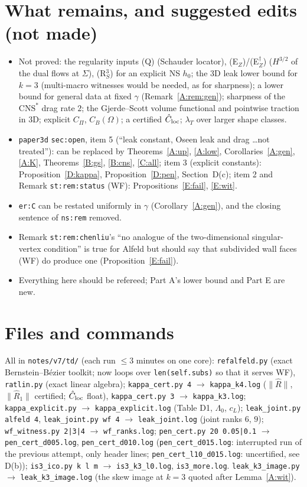 \documentclass[11pt,reqno]{amsart}
\theoremstyle{plain}
\theoremstyle{definition}
\newcommand{\norm}[1]{\lVert #1\rVert}
\newcommand{\CNS}{\mathrm{CNS}^\ast}
\begin{document}
\section{What remains, and suggested edits (not made)}\label{sec:open}
\begin{itemize}
\item Not proved: the regularity inputs (Q) (Schauder locator), (E$_Z$)/(E$_Z^\dagger$) ($H^{3/2}$ of the dual flows at $\Sigma$), (R$_S^3$) for an explicit NS $h_0$; the 3D leak lower bound for $k=3$ (multi-macro witnesses would be needed, as for sharpness); a lower bound for general data at fixed $\gamma$ (Remark~\ref{A:rem:gen}); sharpness of the $\CNS$ drag rate $2$; the Gjerde--Scott volume functional and pointwise traction in 3D; explicit $C_\Pi$, $C_B(\Omega)$; a certified $\hat C_{\rm loc}$; $\lambda_T$ over larger shape classes.
\item \texttt{paper3d} \texttt{sec:open}, item 5 (``leak constant, Oseen leak and drag \dots not treated''): can be replaced by Theorems~\ref{A:up}, \ref{A:low}, Corollaries~\ref{A:gen}, \ref{A:K}, Theorems~\ref{B:gs}, \ref{B:cns}, \ref{C:all}; item 3 (explicit constants): Proposition~\ref{D:kappa}, Proposition~\ref{D:pen}, Section~D(c); item 2 and Remark \texttt{st:rem:status} (WF): Propositions~\ref{E:fail}, \ref{E:wit}.
\item \texttt{er:C} can be restated uniformly in $\gamma$ (Corollary~\ref{A:gen}), and the closing sentence of \texttt{ns:rem} removed.
\item Remark \texttt{st:rem:chenliu}'s ``no analogue of the two-dimensional singular-vertex condition'' is true for Alfeld but should say that subdivided wall faces (WF) do produce one (Proposition~\ref{E:fail}).
\item Everything here should be refereed; Part A's lower bound and Part E are new.
\end{itemize}

\section{Files and commands}\label{sec:files}
All in \texttt{notes/v7/td/} (each run $\le3$ minutes on one core):
\texttt{refalfeld.py} (exact Bernstein--B\'ezier toolkit; now loops over \texttt{len(self.subs)} so that it serves WF), \texttt{ratlin.py} (exact linear algebra);
\texttt{kappa\_cert.py 4} $\to$ \texttt{kappa\_k4.log} ($\norm{\hat R}$, $\norm{\hat R_1}$ certified; $\hat C_{\rm loc}$ float), \texttt{kappa\_cert.py 3} $\to$ \texttt{kappa\_k3.log};
\texttt{kappa\_explicit.py} $\to$ \texttt{kappa\_explicit.log} (Table D1, $\Lambda_0$, $c_L$);
\texttt{leak\_joint.py alfeld 4}, \texttt{leak\_joint.py wf 4} $\to$ \texttt{leak\_joint.log} (joint ranks $6$, $9$);
\texttt{wf\_witness.py 2|3|4} $\to$ \texttt{wf\_ranks.log};
\texttt{pen\_cert.py 20 0.05|0.1} $\to$ \texttt{pen\_cert\_d005.log}, \texttt{pen\_cert\_d010.log} (\texttt{pen\_cert\_d015.log}: interrupted run of the previous attempt, only header lines; \texttt{pen\_cert\_l10\_d015.log}: uncertified, see D(b));
\texttt{is3\_ico.py k l m} $\to$ \texttt{is3\_k3\_l0.log}, \texttt{is3\_more.log}.
\texttt{leak\_k3\_image.py} $\to$ \texttt{leak\_k3\_image.log} (the skew image at $k=3$ quoted after Lemma~\ref{A:wit}).
\end{document}
